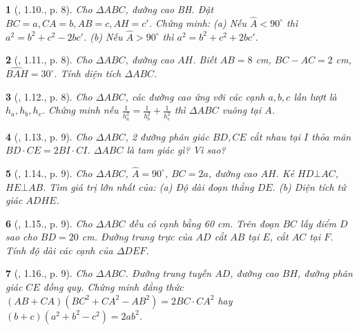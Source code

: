 \documentclass{article}
\newtheorem{baitoan}{}
\begin{document}
\begin{baitoan}[\cite{TLCT_THCS_Toan_9_hinh_hoc}, 1.10., p. 8]
	Cho $\Delta ABC$, đường cao BH. Đặt $BC = a,CA = b,AB = c,AH = c'$. Chứng minh: (a) Nếu $\widehat{A} < 90^\circ$ thì $a^2 = b^2 + c^2 - 2bc'$. (b) Nếu $\widehat{A} > 90^\circ$ thì $a^2 = b^2 + c^2 + 2bc'$.
\end{baitoan}

\begin{baitoan}[\cite{TLCT_THCS_Toan_9_hinh_hoc}, 1.11., p. 8]
	Cho $\Delta ABC$, đường cao $AH$. Biết $AB = 8$ {\rm cm}, $BC - AC = 2$ {\rm cm}, $\widehat{BAH} = 30^\circ$. Tính diện tích $\Delta ABC$.
\end{baitoan}

\begin{baitoan}[\cite{TLCT_THCS_Toan_9_hinh_hoc}, 1.12., p. 8]
	Cho $\Delta ABC$, các đường cao ứng với các cạnh $a,b,c$ lần lượt là $h_a,h_b,h_c$. Chứng minh nếu $\frac{1}{h_a^2} = \frac{1}{h_b^2} + \frac{1}{h_c^2}$ thì $\Delta ABC$ vuông tại $A$.
\end{baitoan}

\begin{baitoan}[\cite{TLCT_THCS_Toan_9_hinh_hoc}, 1.13., p. 9]
	Cho $\Delta ABC$, 2 đường phân giác $BD,CE$ cắt nhau tại $I$ thỏa mãn $BD\cdot CE= 2BI\cdot CI$. $\Delta ABC$ là tam giác gì? Vì sao?
\end{baitoan}

\begin{baitoan}[\cite{TLCT_THCS_Toan_9_hinh_hoc}, 1.14., p. 9]
	Cho $\Delta ABC$, $\widehat{A} = 90^\circ$, $BC = 2a$, đường cao $AH$. Kẻ $HD\bot AC$, $HE\bot AB$. Tìm giá trị lớn nhất của: (a) Độ dài đoạn thẳng $DE$. (b) Diện tích tứ giác $ADHE$.
\end{baitoan}

\begin{baitoan}[\cite{TLCT_THCS_Toan_9_hinh_hoc}, 1.15., p. 9]
	Cho $\Delta ABC$ đều có cạnh bằng {\rm60 cm}. Trên đoạn $BC$ lấy điểm $D$ sao cho $BD = 20$ {\rm cm}. Đường trung trực của $AD$ cắt $AB$ tại $E$, cắt $AC$ tại $F$. Tính độ dài các cạnh của $\Delta DEF$.
\end{baitoan}

\begin{baitoan}[\cite{TLCT_THCS_Toan_9_hinh_hoc}, 1.16., p. 9]
	Cho $\Delta ABC$. Đường trung tuyến $AD$, đường cao $BH$, đường phân giác $CE$ đồng quy. Chứng minh đẳng thức $(AB + CA)(BC^2 + CA^2 - AB^2) = 2BC\cdot CA^2$ hay $(b + c)(a^2 + b^2 - c^2) = 2ab^2$.
\end{baitoan}
\end{document}
